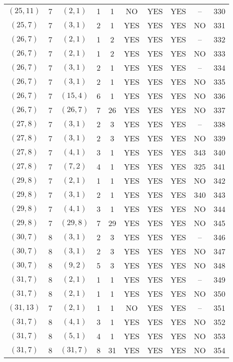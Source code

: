 \begin{longtable}{|c|c|c|c|c|c|c|c|c|c|}
$(25, 11)$ & 7 & $(2, 1)$ & 1 & 1 & NO & YES & YES & -- & 330\\
$(25, 7)$ & 7 & $(3, 1)$ & 2 & 1 & YES & YES & YES & NO & 331\\
$(26, 7)$ & 7 & $(2, 1)$ & 1 & 2 & YES & YES & YES & -- & 332\\
$(26, 7)$ & 7 & $(2, 1)$ & 1 & 2 & YES & YES & YES & NO & 333\\
$(26, 7)$ & 7 & $(3, 1)$ & 2 & 1 & YES & YES & YES & -- & 334\\
$(26, 7)$ & 7 & $(3, 1)$ & 2 & 1 & YES & YES & YES & NO & 335\\
$(26, 7)$ & 7 & $(15, 4)$ & 6 & 1 & YES & YES & YES & NO & 336\\
$(26, 7)$ & 7 & $(26, 7)$ & 7 & 26 & YES & YES & YES & NO & 337\\
$(27, 8)$ & 7 & $(3, 1)$ & 2 & 3 & YES & YES & YES & -- & 338\\
$(27, 8)$ & 7 & $(3, 1)$ & 2 & 3 & YES & YES & YES & NO & 339\\
$(27, 8)$ & 7 & $(4, 1)$ & 3 & 1 & YES & YES & YES & 343 & 340\\
$(27, 8)$ & 7 & $(7, 2)$ & 4 & 1 & YES & YES & YES & 325 & 341\\
$(29, 8)$ & 7 & $(2, 1)$ & 1 & 1 & YES & YES & YES & NO & 342\\
$(29, 8)$ & 7 & $(3, 1)$ & 2 & 1 & YES & YES & YES & 340 & 343\\
$(29, 8)$ & 7 & $(4, 1)$ & 3 & 1 & YES & YES & YES & NO & 344\\
$(29, 8)$ & 7 & $(29, 8)$ & 7 & 29 & YES & YES & YES & NO & 345\\
$(30, 7)$ & 8 & $(3, 1)$ & 2 & 3 & YES & YES & YES & -- & 346\\
$(30, 7)$ & 8 & $(3, 1)$ & 2 & 3 & YES & YES & YES & NO & 347\\
$(30, 7)$ & 8 & $(9, 2)$ & 5 & 3 & YES & YES & YES & NO & 348\\
$(31, 7)$ & 8 & $(2, 1)$ & 1 & 1 & YES & YES & YES & -- & 349\\
$(31, 7)$ & 8 & $(2, 1)$ & 1 & 1 & YES & YES & YES & NO & 350\\
$(31, 13)$ & 7 & $(2, 1)$ & 1 & 1 & NO & YES & YES & -- & 351\\
$(31, 7)$ & 8 & $(4, 1)$ & 3 & 1 & YES & YES & YES & NO & 352\\
$(31, 7)$ & 8 & $(5, 1)$ & 4 & 1 & YES & YES & YES & NO & 353\\
$(31, 7)$ & 8 & $(31, 7)$ & 8 & 31 & YES & YES & YES & NO & 354\\

\end{longtable}
